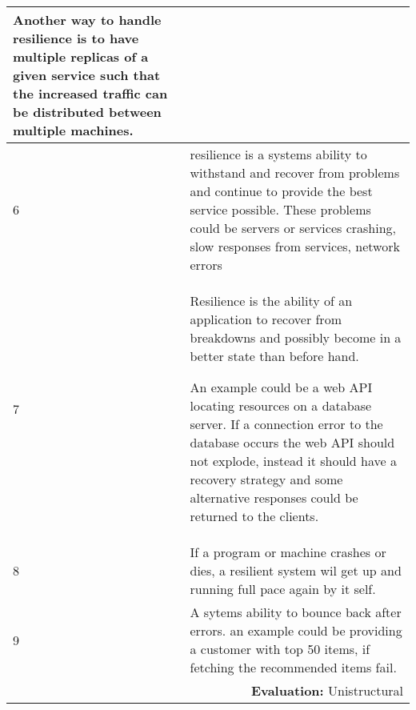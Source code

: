 \begin{longtable}{|p{0.3cm}|p{14.7cm}|}
\noindent Another way to handle resilience is to have multiple replicas of a given service such that the increased traffic can be distributed between multiple machines. \\ \hline
 
6 & resilience is a systems ability to withstand and recover from problems and continue to provide the best service possible. These problems could be servers or services crashing, slow responses from services, network errors \\ \hline

7 & Resilience is the ability of an application to recover from breakdowns and possibly become in a better state than before hand.

\noindent An example could be a web API locating resources on a database server. If a connection error to the database occurs the web API should not explode, instead it should have a recovery strategy and some alternative responses could be returned to the clients. \\ \hline

8 & If a program or machine crashes or dies, a resilient system wil get up and running full pace again by it self.  \\ \hline

9 & A sytems ability to bounce back after errors. an example could be providing a customer with top 50 items, if fetching the recommended items fail. \\ \hline

\multicolumn{2}{r}{\textbf{Evaluation:} Unistructural} \\ 
\end{longtable}
\normalsize



